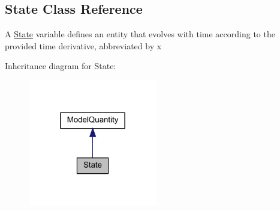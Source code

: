 \hypertarget{classamici_1_1ode__export_1_1_state}{}\subsection{State Class Reference}
\label{classamici_1_1ode__export_1_1_state}


A \mbox{\hyperlink{classamici_1_1ode__export_1_1_state}{State}} variable defines an entity that evolves with time according to the provided time derivative, abbreviated by {\ttfamily x}  




Inheritance diagram for State\+:
\nopagebreak
\begin{figure}[H]
\begin{center}
\leavevmode
\includegraphics[width=160pt]{classamici_1_1ode__export_1_1_state__inherit__graph}
\end{center}
\end{figure}
